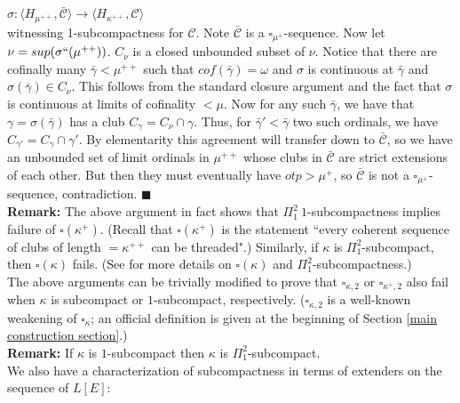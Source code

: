 \documentclass[12pt]{article}
\begin{document}
\indent \indent $\sigma : \langle H_{\mu^{++}} , \bar{\mathscr{C}} \rangle \longrightarrow \langle H_{\kappa^{++} }, \mathscr{C} \rangle$\\

witnessing 1-subcompactness for $\mathscr{C}$.  Note $\bar{\mathscr{C}}$ is a $\square_{\mu^+}$-sequence.  Now let $\nu = sup (\sigma `` (\mu^{++}))$.  $C_\nu$ is a closed unbounded subset of $\nu$.  Notice that there are cofinally many $\bar{\gamma} < \mu^{++}$ such that  $cof (\bar{\gamma}) = \omega$ and $\sigma$ is continuous at $\bar{\gamma}$ and $\sigma ( \bar{\gamma}) \in C_\nu$.  This follows from the standard closure argument and the fact that $\sigma$ is continuous at limits of cofinality $< \mu$.  Now for any such $\bar{\gamma}$, we have that $\gamma = \sigma (\bar{\gamma})$ has a club $C_\gamma = C_\nu \cap \gamma$.  Thus, for $\bar{\gamma}' < \bar{\gamma}$ two such ordinals, we have $C_{\gamma '} = C_{\gamma} \cap \gamma '$.  By elementarity this agreement will transfer down to $\bar{\mathscr{C}}$, so we have an unbounded set of limit ordinals in $\mu^{++}$ whose clubs in $\bar{\mathscr{C}}$ are strict extensions of each other.  But then they must eventually have $otp > \mu^+$, so $\bar{\mathscr{C}}$ is not a $\square_{\mu^+}$-sequence, contradiction.  $\blacksquare$\\

\textbf{Remark:} The above argument in fact shows that $\Pi_1^2 \ 1$-subcompactness implies failure of $\square ( \kappa^+ )$. (Recall that $\square (\kappa^+ )$ is the statement ``every coherent sequence of clubs of length $= \kappa^{++}$ can be threaded".)  Similarly, if $\kappa$ is $\Pi_1^2$-subcompact, then $\square (\kappa)$ fails.  (See \cite{equiconsistencies} for more details on $\square (\kappa ) $ and $\Pi_1^2$-subcompactness.)\\

The above arguments can be trivially modified to prove that $\square_{\kappa , 2}$ or $\square_{\kappa^+ , 2}$ also fail when $\kappa$ is subcompact or $1$-subcompact, respectively.  ($\square_{\kappa , 2}$ is a well-known weakening of $\square_\kappa$; an official definition is given at the beginning of Section \ref{main construction section}.)\\

\textbf{Remark:} If $\kappa$ is $1$-subcompact then $\kappa$ is $\Pi_1^2$-subcompact.\\


We also have a characterization of subcompactness in terms of extenders on the sequence of $L[E]$:\\
\end{document}
